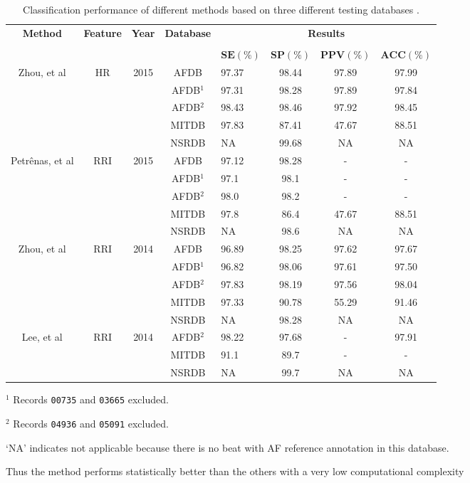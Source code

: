\begin{table}[h]
\begin{threeparttable}
\caption[Performance comparison of some state of the art methods.]{Classification performance of different methods based on three different testing databases \cite[p. 8]{zhou2015}.}
\label{table:zhou_hr_rri}
\scriptsize
  \begin{tabularx}{\linewidth}{c c c c X c c c}
  \toprule
  \textbf{Method} & \textbf{Feature} & \textbf{Year} & \textbf{Database} & \multicolumn{4}{c}{\textbf{Results}} \\
  \cline{5-8}
  \\
  & & & & $\mathbf{SE(\%)}$ & $\mathbf{SP(\%)}$ & $\mathbf{PPV(\%)}$ & $\mathbf{ACC(\%)}$\\
  \midrule  
  Zhou, et al\cite{zhou2015} & HR & 2015 & AFDB & 97.37 & 98.44 & 97.89 & 97.99\\
  & & & AFDB$^1$ & 97.31 & 98.28 & 97.89 & 97.84 \\
  & & & AFDB$^2$ & 98.43 & 98.46 & 97.92 & 98.45 \\
  & & & MITDB & 97.83 & 87.41 & 47.67 & 88.51 \\
  & & & NSRDB & NA & 99.68 & NA & NA \\
  \hline
  Petrênas, et al\cite{petrenas2015} & RRI & 2015 & AFDB & 97.12 & 98.28 & - & -\\
  & & & AFDB$^1$ & 97.1 & 98.1 & - & - \\
  & & & AFDB$^2$ & 98.0 & 98.2 & - & - \\
  & & & MITDB & 97.8 & 86.4 & 47.67 & 88.51 \\
  & & & NSRDB & NA & 98.6 & NA & NA \\
  \hline
  Zhou, et al\cite{zhou2014} & RRI & 2014 & AFDB & 96.89 & 98.25 & 97.62 & 97.67\\
  & & & AFDB$^1$ & 96.82 & 98.06 & 97.61 & 97.50 \\
  & & & AFDB$^2$ & 97.83 & 98.19 & 97.56 & 98.04 \\
  & & & MITDB & 97.33 & 90.78 & 55.29 & 91.46 \\
  & & & NSRDB & NA & 98.28 & NA & NA \\
  \hline
  Lee, et al\cite{lee2013} & RRI & 2014 & AFDB$^2$ & 98.22 & 97.68 & - & 97.91\\
  & & & MITDB & 91.1 & 89.7 & - & - \\
  & & & NSRDB & NA & 99.7 & NA & NA \\
  \bottomrule
\end{tabularx}
\begin{tablenotes}
 	\item $^1$ Records \verb|00735| and \verb|03665| excluded.
	\item $^2$ Records \verb|04936| and \verb|05091| excluded.
	\item ‘NA’ indicates not applicable because there is no beat with AF reference annotation in this database.
    \end{tablenotes}
\end{threeparttable}
\end{table}

Thus the method performs statistically better than the others \cite[p. 11]{zhou2015} with a very low computational complexity \cite[p. 14]{zhou2015}